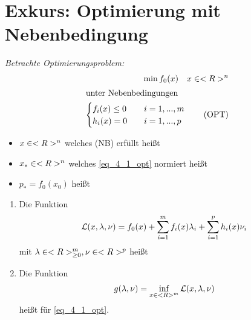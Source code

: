 \section{Exkurs: Optimierung mit Nebenbedingung}
\emph{Betrachte Optimierungsproblem:}
\begin{align*}
	\min f_0(x)\quad x \in <R>^n\\
	\intertext{unter Nebenbedingungen}
	\begin{cases}
		f_i(x) \le 0 &\quad i = 1, ..., m\\
		h_i(x) = 0 &\quad i = 1, ..., p
	\end{cases}
	\tag{OPT}\label{eq_4_1_opt}
\end{align*}
\begin{itemize}
	\item $x \in <R>^n$ welches (NB) erfüllt heißt 
	\item $x_{\ast} \in <R>^n$ welches \eqref{eq_4_1_opt} normiert heißt 
	\item $p_{\ast} = f_0(x_0)$ heißt 
\end{itemize}
\begin{definition}
	\begin{enumerate}
		\item Die Funktion
		\begin{align*}
		\mathcal L(x, \lambda, \nu) = f_0(x) + \sum_{i=1}^{m}f_i(x)\lambda_i + \sum_{i=1}^p h_i(x)\nu_i
		\end{align*}
		mit $\lambda \in <R>^m_{\ge 0}, \nu \in <R>^p$ heißt 
		\item Die Funktion
		\begin{align*}
			g(\lambda, \nu) = \inf_{x \in <R>^m} \mathcal L(x, \lambda, \nu)
		\end{align*}
		heißt  für \eqref{eq_4_1_opt}.
	\end{enumerate}
\end{definition}
